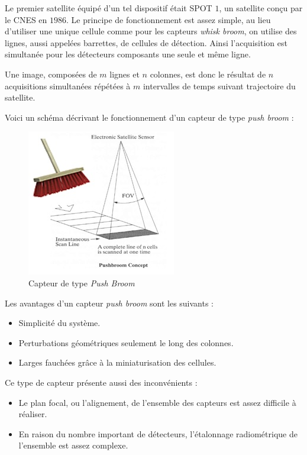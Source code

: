 \documentclass[a4paper, 10pt]{report}
\begin{document}
Le premier satellite équipé d'un tel dispositif était SPOT $1$, un satellite conçu par le CNES en $1986$.
Le principe de fonctionnement est assez simple, au lieu d'utiliser une unique cellule comme pour les capteurs \emph{whisk broom}, on utilise des lignes, aussi appelées barrettes, de cellules de détection.
Ainsi l'acquisition est simultanée pour les détecteurs composants une seule et même ligne.

Une image, composées de $m$ lignes et $n$ colonnes, est donc le résultat de $n$ acquisitions simultanées répétées à $m$ intervalles de temps suivant trajectoire du satellite.

Voici un schéma décrivant le fonctionnement d'un capteur de type \emph{push broom} :
\begin{figure}[H]
	\begin{center}
		\includegraphics[scale=0.7]{Images/Push_Broom.jpg}
		\caption{Capteur de type \emph{Push Broom}}
	\end{center}
\end{figure}
Les avantages d'un capteur \emph{push broom} sont les suivants :
\begin{itemize}
	\item Simplicité du système.
	\item Perturbations géométriques seulement le long des colonnes.
	\item Larges fauchées grâce à la miniaturisation des cellules.
\end{itemize}
Ce type de capteur présente aussi des inconvénients :
\begin{itemize}
	\item Le plan focal, ou l'alignement, de l'ensemble des capteurs est assez difficile à réaliser.
	\item En raison du nombre important de détecteurs, l'étalonnage radiométrique de l'ensemble est assez complexe.
\end{itemize}
\end{document}
